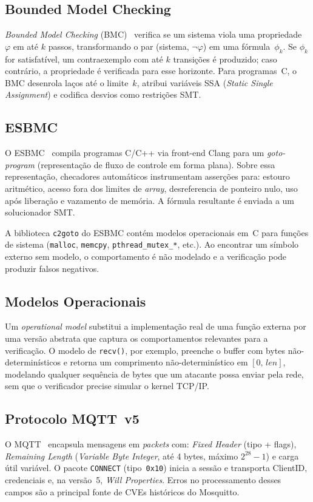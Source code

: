 \documentclass[conference]{IEEEtran}
\begin{document}
\subsection{Bounded Model Checking}
\emph{Bounded Model Checking} (BMC)~\cite{clarke2018handbook} verifica se um
sistema viola uma propriedade~$\varphi$ em at\'e $k$ passos, transformando o par
(sistema, $\neg\varphi$) em uma f\'ormula~$\phi_k$. Se $\phi_k$ for satisfat\'ivel,
um contraexemplo com at\'e $k$ transi\c{c}\~oes \'e produzido; caso contr\'ario, a
propriedade \'e verificada para esse horizonte. Para programas~C, o BMC desenrola
la\c{c}os at\'e o limite~$k$, atribui vari\'aveis SSA (\emph{Static Single
Assignment}) e codifica desvios como restri\c{c}\~oes SMT.

\subsection{ESBMC}
O ESBMC~\cite{cordeiro2012tse,gadelha2017sttt} compila programas C/C++ via
front-end Clang para um \emph{goto-program} (representa\c{c}\~ao de fluxo de
controle em forma plana). Sobre essa representa\c{c}\~ao, checadores autom\'aticos
instrumentam asser\c{c}\~oes para: estouro aritm\'etico, acesso fora dos limites de
\emph{array}, desreferencia de ponteiro nulo, uso ap\'os libera\c{c}\~ao e vazamento
de mem\'oria. A f\'ormula resultante \'e enviada a um solucionador SMT.

A biblioteca \texttt{c2goto} do ESBMC cont\'em modelos operacionais em~C para
fun\c{c}\~oes de sistema (\texttt{malloc}, \texttt{memcpy}, \texttt{pthread\_mutex\_*},
etc.). Ao encontrar um s\'imbolo externo sem modelo, o comportamento \'e n\~ao
modelado e a verifica\c{c}\~ao pode produzir falsos negativos.

\subsection{Modelos Operacionais}
Um \emph{operational model} substitui a implementa\c{c}\~ao real de uma fun\c{c}\~ao
externa por uma vers\~ao abstrata que captura os comportamentos relevantes para a
verifica\c{c}\~ao. O modelo de \texttt{recv()}, por exemplo, preenche o buffer com
bytes n\~ao-determin\'isticos e retorna um comprimento n\~ao-determin\'istico em
$[0,\,\textit{len}]$, modelando qualquer sequ\^encia de bytes que um atacante possa
enviar pela rede, sem que o verificador precise simular o kernel TCP/IP.

\subsection{Protocolo MQTT~v5}
O MQTT~\cite{mqtt_v5_spec} encapsula mensagens em \emph{packets} com: \emph{Fixed
Header} (tipo + flags), \emph{Remaining Length} (\emph{Variable Byte Integer},
at\'e 4 bytes, m\'aximo $2^{28}-1$) e carga \'util vari\'avel. O pacote
\texttt{CONNECT} (tipo~\texttt{0x10}) inicia a sess\~ao e transporta ClientID,
credenciais e, na vers\~ao~5, \emph{Will Properties}. Erros no processamento
desses campos s\~ao a principal fonte de CVEs hist\'oricos do Mosquitto.
\end{document}
